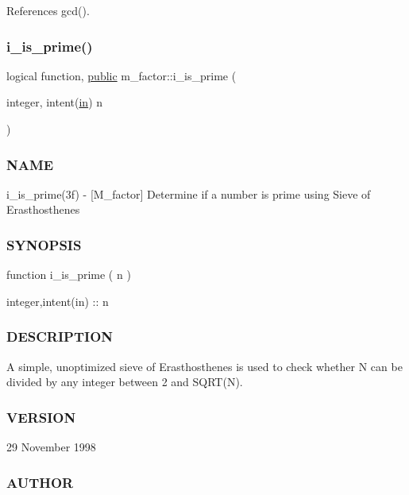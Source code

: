 References gcd().

\mbox{\label{namespacem__factor_afcca43d3d524f6d11d54bbfd475e60d5}} 
\subsubsection{\texorpdfstring{i\+\_\+is\+\_\+prime()}{i\_is\_prime()}}
{\footnotesize\ttfamily logical function, \hyperlink{M__stopwatch_83_8txt_a2f74811300c361e53b430611a7d1769f}{public} m\+\_\+factor\+::i\+\_\+is\+\_\+prime (\begin{DoxyParamCaption}\item[{integer, intent(\hyperlink{M__journal_83_8txt_afce72651d1eed785a2132bee863b2f38}{in})}]{n }\end{DoxyParamCaption})}



\subsubsection*{N\+A\+ME}

i\+\_\+is\+\_\+prime(3f) -\/ \mbox{[}M\+\_\+factor\mbox{]} Determine if a number is prime using Sieve of Erasthosthenes \subsubsection*{S\+Y\+N\+O\+P\+S\+IS}

function i\+\_\+is\+\_\+prime ( n )

integer,intent(in) \+:\+: n

\subsubsection*{D\+E\+S\+C\+R\+I\+P\+T\+I\+ON}

A simple, unoptimized sieve of Erasthosthenes is used to check whether N can be divided by any integer between 2 and S\+Q\+R\+T(\+N).

\subsubsection*{V\+E\+R\+S\+I\+ON}

29 November 1998

\subsubsection*{A\+U\+T\+H\+OR}

